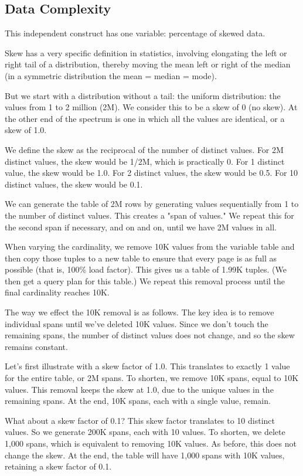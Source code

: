 \documentclass[prodmode,acmtods]{acmsmall}
\begin{document}
\subsection{Data Complexity}\label{sec:datacomplexity}
This independent construct has one variable: percentage of skewed data.

Skew has a very specific definition in statistics, 
involving elongating the left or right tail of a distribution, 
thereby moving the mean left or right of the median 
(in a symmetric distribution the mean = median = mode).

But we start with a distribution without a tail: 
the uniform distribution: the values from 1 to 2 million (2M). 
We consider this to be a skew of 0 (no skew). 
At the other end of the spectrum is one in which all the values are identical, 
or a skew of 1.0.

We define the skew as the reciprocal of the number of distinct values. 
For 2M distinct values, the skew would be 1/2M, which is practically 0. 
For 1 distinct value, the skew would be 1.0. For 2 distinct values, 
the skew would be 0.5. For 10 distinct values, the skew would be 0.1.

We can generate the table of 2M rows by generating values sequentially from
1 to the number of distinct values.  This creates a "span of values." We
repeat this for the second span if necessary, and on and on, until we have
2M values in all.

When varying the cardinality, we remove 10K values from the variable table
and then copy those tuples to a new table to ensure that every page is as
full as possible (that is, 100\% load factor).  This gives us a table of
1.99K tuples. (We then get a query plan for this table.)  We repeat this
removal process until the final cardinality reaches 10K.

The way we effect the 10K removal is as follows. 
The key idea is to remove individual spans until we've deleted 10K
values. Since we don't touch the remaining spans, the number of distinct
values does not change, and so the skew remains constant.

Let's first illustrate with a skew factor of 1.0. 
This translates to exactly 1 value for the entire table, or 2M spans.
To shorten, we remove 10K spans, equal to 10K values. 
This removal keeps the skew at 1.0, due to the unique values in the
remaining spans.
At the end, 10K spans, each with a single value, remain.

What about a skew factor of 0.1? 
This skew factor translates to 10 distinct values. 
So we generate 200K spans, each with 10 values. 
To shorten, we delete 1,000 spans, which is equivalent to removing 10K values. 
As before, this does not change the skew.
At the end, the table will have 1,000 spans with 10K values, retaining a
skew factor of 0.1.
\end{document}
